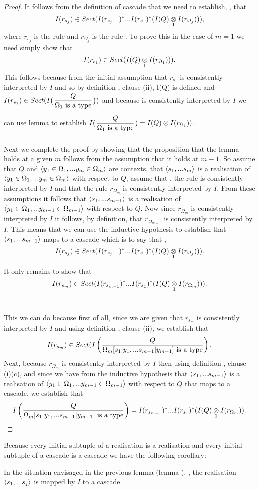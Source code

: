 \begin{proof}
It follows from the definition of cascade that we need to establish, \foreachj, that
 $$I(r_{s_j}) \in Sect(I(r_{s_{j-1}})^*...I(r_{s_1})^*(\crossx{I(Q)}{I(r_{\Omega_j})}{1})) ,$$
  where $r_{s_j}$ is the rule  and $r_{\Omega_j}$ is the rule .
To prove this in the case of $m=1$ we need simply show that 
 $$I(r_{s_1}) \in Sect(\crossx{I(Q)}{I(r_{\Omega_1})}{1})).$$
 This follows because from the initial assumption that $r_{s_1}$ is consistently interpreted by $I$ and so by definition , clause (ii),
 I(Q) is defined and  $I(r_{s_1}) \in Sect(I\big(\gatdisplayrule{Q}{\isT{\Omega_1}}\big))$ 
 and because  is consistently interpreted by $I$ we can use lemma  to establish $I(\gatdisplayrule{Q}{\isT{\Omega_1}}) = \crossx{I(Q)}{I(r_{\Omega_1})}{1})$.

Next we complete the proof by showing that the proposition that the lemma holds at a given $m$ follows from
the assumption that it holds at $m-1$. So assume that $Q$  and $\encyOmega{m}$ are contexts, 
that $\tuple{\sm}$ is a realisation of $\tuple{\yOmega{m}}$ with respect to $Q$,
assume that \foreachj, the rule  is consistently interpreted by $I$ 
and that the rule $r_{\Omega_m}$ is consistently interpreted by $I$. 
From these assumptions it follows
that  $\tuple{\sm[-1]}$ is a realisation of $\tuple{\yOmega{m-1}}$ with respect to $Q$.
Now since $r_{\Omega_m}$ is consistently interpreted by $I$ it follows, by definition,  that $r_{\Omega_{m-1}}$ is consistently interpreted by $I$. This means that we can use the inductive hypothesis to establish that $\tuple{\sm[-1]}$ maps to a cascade which is to say that \foreachj[m-1],  
$$I(r_{s_j}) \in Sect(I(r_{s_{j-1}})^*...I(r_{s_1})^*(\crossx{I(Q)}{I(r_{\Omega_j})}{1})).$$

It only remains to show that
$$I(r_{s_m}) \in Sect(I(r_{s_{m-1}})^*...I(r_{s_1})^*(\crossx{I(Q)}{I(r_{\Omega_m})}{1})).$$ \

This we can do because first of all, since we are given that $r_{s_m}$ is consistently interpreted by $I$ and using definition , clause (ii), we establish that
$$I(r_{s_m}) \in Sect(\Imappedrule{Q}{\isT{\Omega_m[\SUBsFORy{m-1}]}}.$$ 
Next, because $r_{\Omega_m}$ is consistently interpreted by $I$ then using definition , clause (i)(c), 
and since we have from the inductive hypothesis that $\tuple{\sm[-1]}$ is a realisation of $\tuple{\yOmega{m-1}}$ with respect to $Q$ that maps to a cascade,
we establish that
 $$\Imappedrule{Q}{\isT{\Omega_m[\SUBsFORy{m-1}]}}= I(r_{s_{m-1}})^*...I(r_{s_1})^*(\crossx{I(Q)}{I(r_{\Omega_m})}{1}).$$
 \end{proof}
Because every initial subtuple of a realisation is a realisation and every initial subtuple of a cascade is a cascade we have the following corollary:
 \begin{corollary}
 In the situation envisaged in the previous  lemma (lemma ), \foreachj,
 the realisation $\tuple{s_1,...s_j}$ is mapped by $I$ to a cascade. 
 \end{corollary}

